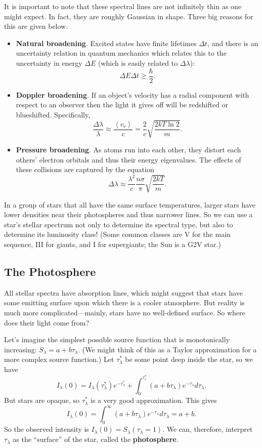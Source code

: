 \documentclass[../a062main.tex]{subfiles}
\begin{document}
It is important to note that these spectral lines are not infinitely thin as one might expect.
In fact, they are roughly Gaussian in shape.
Three big reasons for this are given below.
\begin{itemize}
    \item \textbf{Natural broadening}.
    Excited states have finite lifetimes $\Delta t$, and there is an uncertainty relation in quantum mechanics which relates this to the uncertainty in energy $\Delta E$ (which is easily related to $\Delta \lambda$):
    \[ \Delta E \Delta t \geq \frac{\hbar}{2}. \]

    \item \textbf{Doppler broadening}.
    If an object's velocity has a radial component with respect to an observer then the light it gives off will be redshifted or blueshifted.
    Specifically,
    \[ \frac{\Delta \lambda}{\lambda} \approx \frac{\left< v_r \right>}{c} = \frac{2}{c} \sqrt{\frac{2kT \ln 2}{m}}. \]

    \item \textbf{Pressure broadening}.
    As atoms run into each other, they distort each others' electron orbitals and thus their energy eigenvalues.
    The effects of these collisions are captured by the equation
    \[ \Delta \lambda \approx \frac{\lambda^2}{c} \frac{n\sigma}{\pi} \sqrt{\frac{2kT}{m}}. \]
\end{itemize}
In a group of stars that all have the same surface temperatures, larger stars have lower densities near their photospheres and thus narrower lines.
So we can use a star's stellar spectrum not only to determine its spectral type, but also to determine its luminosity class!
(Some common classes are V for the main sequence, III for giants, and I for supergiants; the Sun is a G2V star.)

\subsection*{The Photosphere}
All stellar spectra have absorption lines, which might suggest that stars have some emitting surface upon which there is a cooler atmosphere.
But reality is much more complicated---mainly, stars have no well-defined surface.
So where does their light come from?

Let's imagine the simplest possible source function that is monotonically increasing: $S_\lambda = a + b\tau_\lambda$.
(We might think of this as a Taylor approximation for a more complex source function.)
Let $\tau_\lambda^*$ be some point deep inside the star, so we have
\[ I_\lambda(0) = I_\lambda(\tau_\lambda^*)e^{-\tau_\lambda^*} + \int_{0}^{\tau_\tau^*} (a + b\tau_\lambda)e^{-\tau_\lambda} d\tau_\lambda. \]
But stars are opaque, so $\tau_\lambda^*$ is a very good approximation.
This gives
\[ I_\lambda(0) = \int_{0}^{\infty} (a + b\tau_\lambda) e^{-\tau_\lambda} d\tau_\lambda = a + b. \]
So the observed intensity is $I_\lambda(0) = S_\lambda(\tau_\lambda = 1)$.
We can, therefore, interpret $\tau_\lambda$ as the ``surface'' of the star, called the \textbf{photosphere}.
\end{document}

